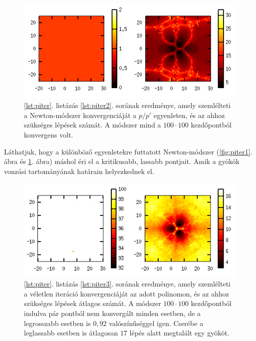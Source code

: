 \documentclass[a4paper,12pt]{report}
\begin{document}
				\begin{figure}[h]
					\centering
					\includegraphics[scale=0.7]{kepek/p-iter2.png}
					\caption{\ref{lst:piter}. listázás \ref{lst:piter2}. sorának eredménye, amely szemlélteti a Newton-módszer konvergenciáját a $p/p'$ egyenleten, és az ahhoz szükséges lépések számát. A módszer mind a $100\cdot 100$ kezdőpontból konvergens volt.} \label{fig:piter2}
				\end{figure}

				Láthatjuk, hogy a különböző egyenletekre futtatott Newton-módszer (\ref{fig:piter1}. ábra és \ref{fig:piter2}. ábra) máshol éri el a kritikusabb, lassabb pontjait. Amik a gyökök vonzási tartományának határain helyezkednek el.

				\begin{figure}[h]
					\centering
					\includegraphics[scale=0.7]{kepek/p-iter3.png}
					\caption{\ref{lst:piter}. listázás \ref{lst:piter3}. sorának eredménye, amely szemlélteti a véletlen iteráció konvergenciáját az adott polinomon, és az ahhoz szükséges lépések átlagos számát. A módszer $100\cdot 100$ kezdőpontból indulva pár pontból nem konvergált minden esetben, de a legrosszabb esetben is $0,\!92$ valószínűséggel igen. Cserébe a leglassabb esetben is átlagosan $17$ lépés alatt megtalált egy gyököt.} \label{fig:piter3}
				\end{figure}
\end{document}
